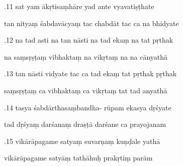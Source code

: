 \documentclass[article,12pt,a4paper]{memoir}%
\newcounter{parCount}
\begin{document}
	  
	  \pstart {}.11 sat yam ākṛtisaṃhāre yad ante vyavatiṣṭhate 
	{}
	\pend%
      

	  
	  \pstart \leavevmode%
	tan nityaṃ śabdavācyaṃ tac chabdāt tac ca na bhidyate 
	{}
	\pend%
      

	  
	  \pstart {}.12 na tad asti na tan nāsti na tad ekaṃ na tat pṛthak 
	{}
	\pend%
      

	  
	  \pstart \leavevmode%
	na saṃsṛṣṭaṃ vibhaktaṃ na vikṛtaṃ na na cānyathā 
	{}
	\pend%
      

	  
	  \pstart {}.13 tan nāsti vidyate tac ca tad ekaṃ tat pṛthak pṛthak 
	{}
	\pend%
      

	  
	  \pstart \leavevmode%
	saṃsṛṣṭaṃ ca vibhaktaṃ ca vikṛtaṃ tat tad anyathā 
	{}
	\pend%
      

	  
	  \pstart {}.14 tasya śabdārthasaṃbandha- rūpam ekasya dṛśyate 
	{}
	\pend%
      

	  
	  \pstart \leavevmode%
	tad dṛśyaṃ darśanaṃ draṣṭā darśane ca prayojanam 
	{}
	\pend%
      

	  
	  \pstart {}.15 vikārāpagame satyaṃ suvarṇaṃ kuṇḍale yathā 
	{}
	\pend%
      

	  
	  \pstart \leavevmode%
	vikārāpagame satyāṃ tathāhuḥ prakṛtiṃ parām 
	{}
	\pend%
      
\end{document}
